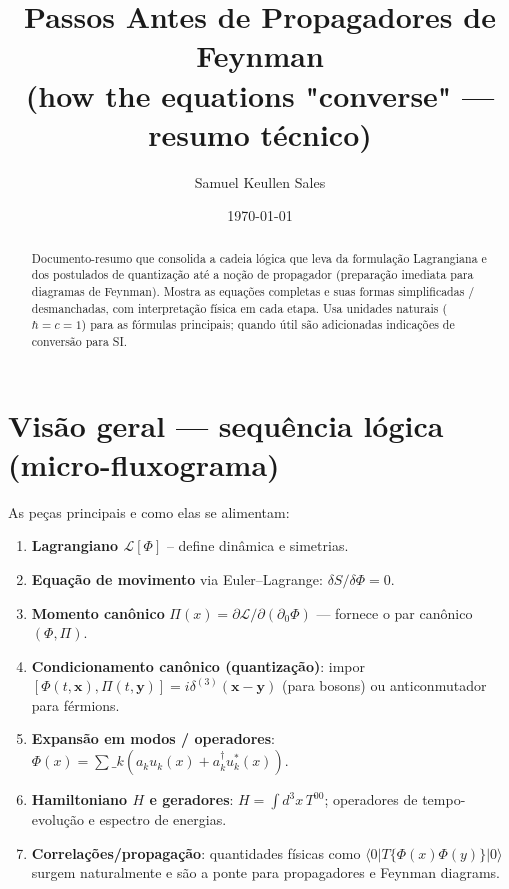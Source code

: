 \documentclass[12pt,a4paper]{article}
\title{Passos Antes de Propagadores de Feynman\\\small{(how the equations "converse" — resumo técnico)}}
\author{Samuel Keullen Sales}
\date{\today}
\begin{document}
\maketitle

\begin{abstract}
Documento-resumo que consolida a cadeia lógica que leva da formulação Lagrangiana e dos postulados de quantização até a noção de propagador (preparação imediata para diagramas de Feynman). Mostra as equações completas e suas formas simplificadas / desmanchadas, com interpretação física em cada etapa. Usa unidades naturais ($\hbar=c=1$) para as fórmulas principais; quando útil são adicionadas indicações de conversão para SI.
\end{abstract}

\section{Visão geral — sequência lógica (micro-fluxograma)}
As peças principais e como elas se alimentam:
\begin{enumerate}
  \item \textbf{Lagrangiano $\mathcal{L}[\Phi]$} -- define dinâmica e simetrias.\\
  \item \textbf{Equação de movimento} via Euler--Lagrange: $\delta S/\delta\Phi=0$.\\
  \item \textbf{Momento canônico} $\Pi(x)=\partial\mathcal{L}/\partial(\partial_0\Phi)$ — fornece o par canônico $(\Phi,\Pi)$.\\
  \item \textbf{Condicionamento canônico (quantização)}: impor $[\Phi(t,\mathbf{x}),\Pi(t,\mathbf{y})]=i\delta^{(3)}(\mathbf{x}-\mathbf{y})$ (para bosons) ou anticonmutador para férmions.\\
  \item \textbf{Expansão em modos / operadores}: $\Phi(x)=\sum\_k (a_k u_k(x)+a_k^\dagger u_k^*(x))$.\\
  \item \textbf{Hamiltoniano $H$ e geradores}: $H=\int d^3x\,T^{00}$; operadores de tempo-evolução e espectro de energias.\\
  \item \textbf{Correlações/propagação}: quantidades físicas como $\langle0|T\{\Phi(x)\Phi(y)\}|0\rangle$ surgem naturalmente e são a ponte para propagadores e Feynman diagrams.
\end{enumerate}
\end{document}
